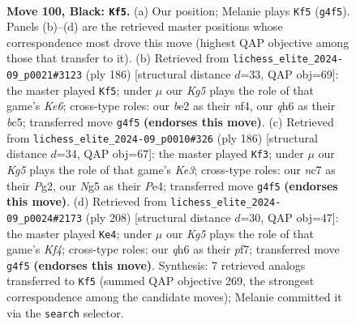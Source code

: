 \documentclass[11pt]{article}
\begin{document}
\clearpage

\begin{figure}[p]\centering
\begin{subfigure}{0.46\textwidth}\centering
\resizebox{\linewidth}{!}{%
\newchessgame
\chessboard[
  setfen={8/2N4b/7Q/6n1/1p4k1/4K3/4B3/8 b - - 1 100},
  showmover=false,
  pgfstyle=straightmove, color=movearrow, markmove={g4-f5}
]}
\caption{}
\end{subfigure}\hfill
\begin{subfigure}{0.46\textwidth}\centering
\resizebox{\linewidth}{!}{%
\newchessgame
\chessboard[
  setfen={R7/8/4K3/2b3P1/2k2n2/8/8/8 w - - 7 94},
  showmover=false,
  pgfstyle=straightmove, color=movearrow, markmove={e6-f5}
]}
\caption{}
\end{subfigure}
\\[4pt]
\begin{subfigure}{0.46\textwidth}\centering
\resizebox{\linewidth}{!}{%
\newchessgame
\chessboard[
  setfen={8/5B2/8/2b1k3/4P3/4K3/6P1/8 w - - 63 94},
  showmover=false,
  pgfstyle=straightmove, color=movearrow, markmove={e3-f3}
]}
\caption{}
\end{subfigure}\hfill
\begin{subfigure}{0.46\textwidth}\centering
\resizebox{\linewidth}{!}{%
\newchessgame
\chessboard[
  setfen={8/5p2/5k2/5B2/5K2/6N1/8/2b5 w - - 1 105},
  showmover=false,
  pgfstyle=straightmove, color=movearrow, markmove={f4-e4}
]}
\caption{}
\end{subfigure}
\caption{\textbf{Move 100, Black: \texttt{Kf5}.} (a) Our position; Melanie plays \texttt{Kf5} (\texttt{g4f5}). Panels (b)--(d) are the retrieved master positions whose correspondence most drove this move (highest QAP objective among those that transfer to it). (b) Retrieved from \texttt{lichess\_elite\_2024-09\_p0021\#3123} (ply 186) [structural distance $d$=33, QAP obj=69]: the master played \texttt{Kf5}; under $\mu$ our \emph{Kg5} plays the role of that game's \emph{Ke6}; cross-type roles: our \emph{b}e2 as their \emph{n}f4, our \emph{q}h6 as their \emph{b}c5; transferred move \texttt{g4f5} \textbf{(endorses this move)}. (c) Retrieved from \texttt{lichess\_elite\_2024-09\_p0010\#326} (ply 186) [structural distance $d$=34, QAP obj=67]: the master played \texttt{Kf3}; under $\mu$ our \emph{Kg5} plays the role of that game's \emph{Ke3}; cross-type roles: our \emph{n}c7 as their \emph{P}g2, our \emph{N}g5 as their \emph{P}e4; transferred move \texttt{g4f5} \textbf{(endorses this move)}. (d) Retrieved from \texttt{lichess\_elite\_2024-09\_p0024\#2173} (ply 208) [structural distance $d$=30, QAP obj=47]: the master played \texttt{Ke4}; under $\mu$ our \emph{Kg5} plays the role of that game's \emph{Kf4}; cross-type roles: our \emph{q}h6 as their \emph{p}f7; transferred move \texttt{g4f5} \textbf{(endorses this move)}. Synthesis: 7 retrieved analogs transferred to \texttt{Kf5} (summed QAP objective 269, the strongest correspondence among the candidate moves); Melanie committed it via the \texttt{search} selector.}
\label{fig:thought-m199}
\end{figure}
\end{document}

